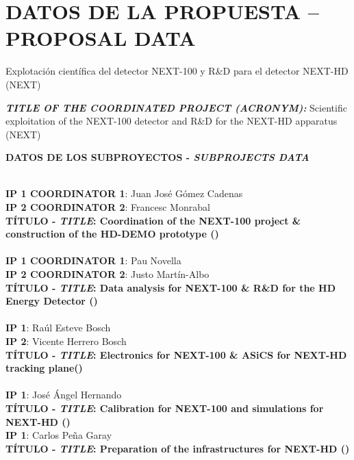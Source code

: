\documentclass[a4paper,11pt,oneside, english]{article}
\begin{document}
	\section{\small DATOS DE LA PROPUESTA -- PROPOSAL DATA}
	\begin{tcolorbox}[colback=white,arc=0pt,outer arc=0pt,colframe=black,boxrule=0.6pt,left=0mm,right=0mm]
 Explotación científica del detector NEXT-100 y R\&D para el detector NEXT-HD (NEXT) 
\end{tcolorbox}
{\bf \emph{TITLE OF THE COORDINATED PROJECT (ACRONYM):}} Scientific exploitation of the NEXT-100 detector and R\&D for the NEXT-HD apparatus (NEXT)
\vspace{3pt}
\begin{tcolorbox}[colback=white,arc=0pt,outer arc=0pt,colframe=black,boxrule=0.6pt,left=0mm]
  \textbf{DATOS DE LOS SUBPROYECTOS - \emph{SUBPROJECTS DATA}}
\end{tcolorbox}
\\
{\bf IP 1 COORDINATOR 1}: Juan Jos\'e G\'omez Cadenas\\
{\bf IP 2 COORDINATOR 2}: Francesc Monrabal\\
{\bf T\'ITULO - \emph{TITLE}: Coordination of the NEXT-100 project \& construction of the HD-DEMO prototype (\sDIPC)}\\
\\
{\bf IP 1 COORDINATOR 1}: Pau Novella\\
{\bf IP 2 COORDINATOR 2}: Justo Mart\'in-Albo\\
{\bf T\'ITULO - \emph{TITLE}: Data analysis for NEXT-100 \& R\&D for the HD Energy Detector  (\sIFIC)}\\
\\
{\bf IP 1}: Ra\'ul Esteve Bosch\\
{\bf IP 2}: Vicente Herrero Bosch\\
{\bf T\'ITULO - \emph{TITLE}: Electronics for NEXT-100 \& ASiCS for NEXT-HD tracking plane(\sUPV)}\\
\\
{\bf IP 1}: Jos\'e \' Angel Hernando\\
{\bf T\'ITULO - \emph{TITLE}: Calibration for NEXT-100 and simulations for NEXT-HD (\sUSC)}
\\
{\bf IP 1}: Carlos Pe\~na Garay\\
{\bf T\'ITULO - \emph{TITLE}: Preparation of the infrastructures for NEXT-HD (\sLSC)}
\end{document}

